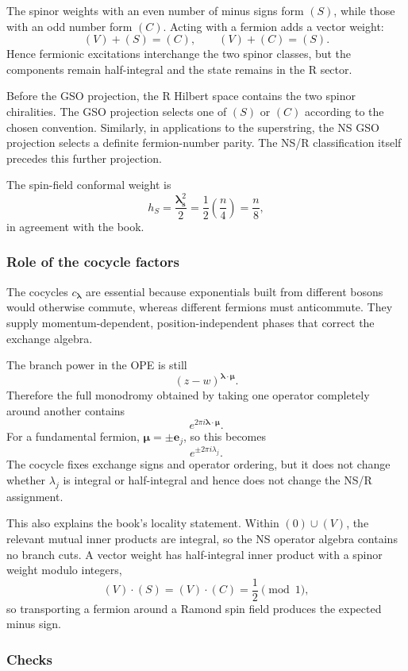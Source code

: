 \documentclass[
  10pt,
  a4paper,
  openany]{book}
\begin{document}
The spinor weights with an even number of minus signs form \((S)\),
while those with an odd number form \((C)\). Acting with a fermion adds
a vector weight: \[
(V)+(S)=(C),
\qquad
(V)+(C)=(S).
\] Hence fermionic excitations interchange the two spinor classes, but
the components remain half-integral and the state remains in the R
sector.

Before the GSO projection, the R Hilbert space contains the two spinor
chiralities. The GSO projection selects one of \((S)\) or \((C)\)
according to the chosen convention. Similarly, in applications to the
superstring, the NS GSO projection selects a definite fermion-number
parity. The NS/R classification itself precedes this further projection.

The spin-field conformal weight is \[
h_S
=\frac{\boldsymbol\lambda_{\mathbf s}^2}{2}
=\frac12\left(\frac n4\right)
=\frac n8,
\] in agreement with the book.

\subsubsection{Role of the cocycle
factors}\label{role-of-the-cocycle-factors}

The cocycles \(c_{\boldsymbol\lambda}\) are essential because
exponentials built from different bosons would otherwise commute,
whereas different fermions must anticommute. They supply
momentum-dependent, position-independent phases that correct the
exchange algebra.

The branch power in the OPE is still \[
(z-w)^{\boldsymbol\lambda\cdot\boldsymbol\mu}.
\] Therefore the full monodromy obtained by taking one operator
completely around another contains \[
e^{2\pi i\boldsymbol\lambda\cdot\boldsymbol\mu}.
\] For a fundamental fermion, \(\boldsymbol\mu=\pm\mathbf e_j\), so this
becomes \[
e^{\pm2\pi i\lambda_j}.
\] The cocycle fixes exchange signs and operator ordering, but it does
not change whether \(\lambda_j\) is integral or half-integral and hence
does not change the NS/R assignment.

This also explains the book's locality statement. Within \((0)\cup(V)\),
the relevant mutual inner products are integral, so the NS operator
algebra contains no branch cuts. A vector weight has half-integral inner
product with a spinor weight modulo integers, \[
(V)\cdot(S)
=(V)\cdot(C)
=\frac12\pmod1,
\] so transporting a fermion around a Ramond spin field produces the
expected minus sign.

\subsubsection{Checks}\label{checks-15}
\end{document}
